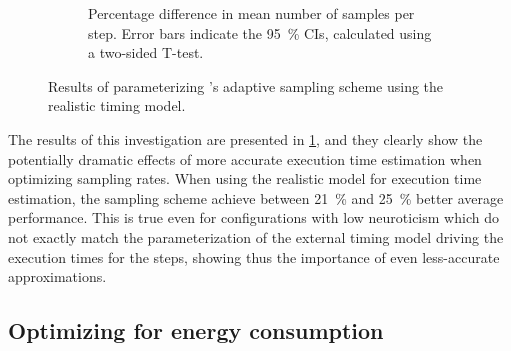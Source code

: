 \begin{figure}
\begin{subfigure}[]{\columnwidth}
        \caption{%
            Percentage difference in mean number of samples per step.
            Error bars indicate the \SI{95}{\percent} \acp{CI}, calculated using a two-sided T-test.
        }
    \end{subfigure}
    \caption{Results of parameterizing \textcite{Wang2019Towards}'s adaptive sampling scheme using the realistic timing model.}\label{fig:samples}
\end{figure}

The results of this investigation are presented in \cref{fig:samples}, and they clearly show the potentially dramatic effects of more accurate execution time estimation when optimizing sampling rates.
When using the realistic model for execution time estimation, the sampling scheme achieve between \SI{21}{\percent} and \SI{25}{\percent} better average performance.
This is true even for configurations with low neuroticism which do not exactly match the parameterization of the external timing model driving the execution times for the steps, showing thus the importance of even less-accurate approximations.

\subsection{Optimizing for energy consumption}

